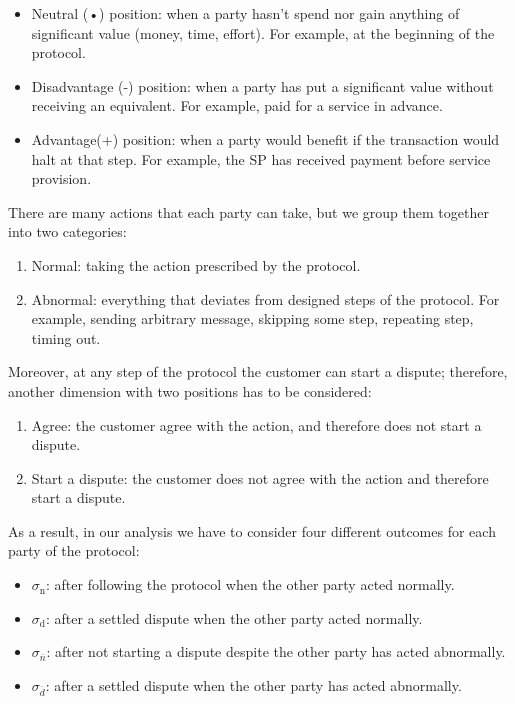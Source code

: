 \documentclass{ieeeaccess}
\begin{document}
\begin{itemize}
\item
  Neutral (•) position: when a party hasn't spend nor gain anything of significant value (money, time, effort). For example, at the beginning of the protocol.
\item
  Disadvantage (-) position: when a party has put a significant value without receiving an equivalent. For example, paid for a service in
  advance.
\item
  Advantage(+) position: when a party would benefit if the transaction would halt at that step. For example, the SP has received payment before service provision.
\end{itemize}

There are many actions that each party can take, but we group them together into two categories:

\begin{enumerate}
\def\labelenumi{\arabic{enumi}.}

\item
  Normal: taking the action prescribed by the protocol.
\item
  Abnormal: everything that deviates from designed steps of the protocol. For example, sending arbitrary message, skipping some step, repeating step, timing out.
\end{enumerate}

Moreover, at any step of the protocol the customer can start a dispute; therefore, another dimension with two positions has to be considered:

\begin{enumerate}
\def\labelenumi{\arabic{enumi}.}

\item
  Agree: the customer agree with the action, and therefore does not start a dispute.
\item
  Start a dispute: the customer does not agree with the action and therefore start a dispute.
\end{enumerate}

As a result, in our analysis we have to consider four different outcomes for each party of the protocol:

\begin{itemize}

\item
  $\sigma_\mathrm{n}$: after following the protocol when the other party acted normally.
\item
  $\sigma_\mathrm{d}$: after a settled dispute when the other party acted normally.
\item
  $\sigma_\overline{n}$: after not starting a dispute despite the other party has acted abnormally.
\item
  $\sigma_\overline{d}$: after a settled dispute when the other party has acted abnormally.
\end{itemize}
\end{document}
